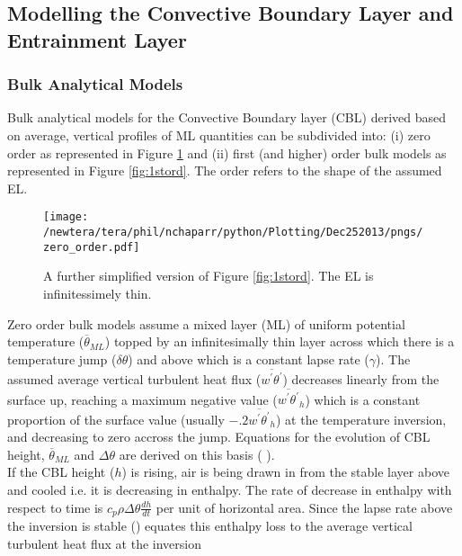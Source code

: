 \subsection{Modelling the Convective Boundary Layer and Entrainment Layer}
\label{subsec:}

\subsubsection{Bulk Analytical Models}
\label{subsubsec:}
Bulk analytical models for the Convective Boundary layer (\acs{CBL}) derived based on average, vertical profiles
of \acs{ML} quantities can be subdivided into: (i) zero order as represented in Figure \ref{fig:0order} and 
(ii) first (and higher) order bulk models as represented in Figure \ref{fig:1stord}. The order refers to the 
shape of the assumed \acs{EL}.\\

\begin{figure}[htbp]
    \centering
    \texttt{[image: /newtera/tera/phil/nchaparr/python/Plotting/Dec252013/pngs/zero\_order.pdf]}
    \caption{A further simplified version of Figure \ref{fig:1stord}.  The \acs{EL} is infinitessimely thin.}
    \label{fig:0order}   %
\end{figure}

Zero order bulk models assume a mixed layer (\acs{ML}) of uniform potential temperature ($\overline{\theta}_{ML}$) 
topped by an infinitesimally thin layer across which there is a temperature jump ($\delta \theta$) and above which 
is a constant lapse rate ($\gamma$).  The assumed average vertical turbulent heat flux ($\overline{w^{'}\theta^{'}}$) 
decreases linearly from the surface up, reaching a maximum negative value ($\overline{w^{'}\theta^{'}}_{h}$) which  
is a constant proportion of the surface value (usually $-.2\overline{w^{'}\theta^{'}}_{h}$) at the temperature inversion, 
and decreasing to zero accross the jump.  Equations for the evolution of \acs{CBL} height, $\overline{\theta}_{ML}$ 
and $\Delta \theta$ are derived on this basis (\citeauthor{Tennekes73} \citeyear{Tennekes73}).\\

If the \acs{CBL} height ($h$) is rising, air is being drawn in from the stable layer above and cooled i.e. it is
decreasing in enthalpy.  The rate of decrease in enthalpy with respect to time is $c_{p}\rho\Delta \theta \frac{dh}{dt}$ 
per unit of horizontal area.  Since the lapse rate above the inversion is stable \citeauthor{Tennekes73} 
(\citeyear{Tennekes73}) equates this enthalpy loss to the average vertical turbulent heat flux at the inversion

